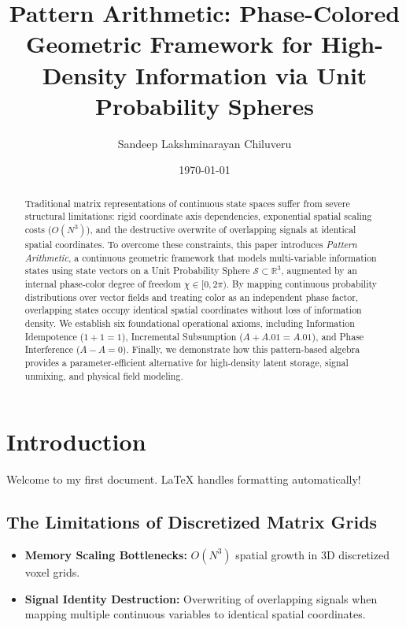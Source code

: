 \documentclass[12pt, a4paper]{article}
\title{Pattern Arithmetic: Phase-Colored Geometric Framework for High-Density Information via Unit Probability Spheres}
\author{Sandeep Lakshminarayan Chiluveru}
\date{\today}
\begin{document}
\maketitle

\begin{abstract}
Traditional matrix representations of continuous state spaces suffer from severe structural limitations: rigid coordinate axis dependencies, exponential spatial scaling costs ($O(N^3)$), and the destructive overwrite of overlapping signals at identical spatial coordinates. To overcome these constraints, this paper introduces \textit{Pattern Arithmetic}, a continuous geometric framework that models multi-variable information states using state vectors on a Unit Probability Sphere $\mathcal{S} \subset \mathbb{R}^3$, augmented by an internal phase-color degree of freedom $\chi \in [0, 2\pi)$. By mapping continuous probability distributions over vector fields and treating color as an independent phase factor, overlapping states occupy identical spatial coordinates without loss of information density. We establish six foundational operational axioms, including Information Idempotence ($1 + 1 = 1$), Incremental Subsumption ($A + A.01 = A.01$), and Phase Interference ($A - A = 0$). Finally, we demonstrate how this pattern-based algebra provides a parameter-efficient alternative for high-density latent storage, signal unmixing, and physical field modeling.
\end{abstract}

\section{Introduction}
Welcome to my first document. LaTeX handles formatting automatically!

\subsection{The Limitations of Discretized Matrix Grids}
\begin{itemize}
    \item \textbf{Memory Scaling Bottlenecks:} $O(N^3)$ spatial growth in 3D discretized voxel grids.
    \item \textbf{Signal Identity Destruction:} Overwriting of overlapping signals when mapping multiple continuous variables to identical spatial coordinates.
\end{itemize}
\end{document}
